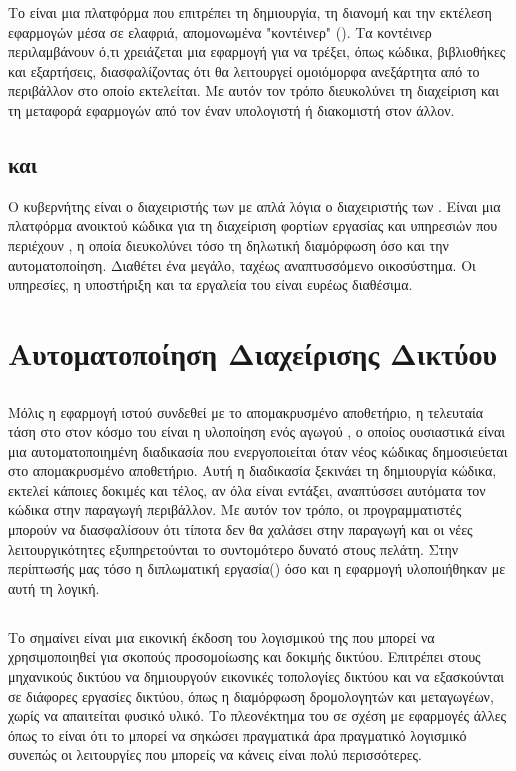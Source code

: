 Το  είναι μια πλατφόρμα που επιτρέπει τη δημιουργία, τη διανομή και την εκτέλεση εφαρμογών μέσα σε ελαφριά, απομονωμένα "κοντέινερ" (). 
Τα κοντέινερ περιλαμβάνουν ό,τι χρειάζεται μια εφαρμογή για να τρέξει, όπως κώδικα, βιβλιοθήκες και εξαρτήσεις, διασφαλίζοντας ότι θα λειτουργεί ομοιόμορφα 
ανεξάρτητα από το περιβάλλον στο οποίο εκτελείται. Με αυτόν τον τρόπο διευκολύνει τη διαχείριση και τη μεταφορά εφαρμογών από τον έναν υπολογιστή ή διακομιστή 
στον άλλον.

\subsection{ και }
Ο κυβερνήτης είναι ο διαχειριστής των με απλά λόγια ο διαχειριστής των . Είναι μια 
πλατφόρμα ανοικτού κώδικα για τη διαχείριση φορτίων εργασίας και υπηρεσιών που περιέχουν 
, η οποία διευκολύνει τόσο τη δηλωτική διαμόρφωση όσο και την αυτοματοποίηση. 
Διαθέτει ένα μεγάλο, ταχέως αναπτυσσόμενο οικοσύστημα. Οι υπηρεσίες, η υποστήριξη και τα εργαλεία του  είναι ευρέως διαθέσιμα.

\section{Αυτοματοποίηση Διαχείρισης Δικτύου}

\subsection{}
Μόλις η εφαρμογή ιστού συνδεθεί με το απομακρυσμένο αποθετήριο, η τελευταία τάση στο
στον κόσμο του  είναι η υλοποίηση ενός αγωγού , ο οποίος ουσιαστικά
είναι μια αυτοματοποιημένη διαδικασία που ενεργοποιείται όταν νέος κώδικας δημοσιεύεται στο
απομακρυσμένο αποθετήριο. Αυτή η διαδικασία ξεκινάει τη δημιουργία κώδικα, εκτελεί κάποιες δοκιμές και
τέλος, αν όλα είναι εντάξει, αναπτύσσει αυτόματα τον κώδικα στην παραγωγή
περιβάλλον. Με αυτόν τον τρόπο, οι προγραμματιστές μπορούν να διασφαλίσουν ότι τίποτα δεν θα χαλάσει
στην παραγωγή και οι νέες λειτουργικότητες εξυπηρετούνται το συντομότερο δυνατό στους
πελάτη. Στην περίπτωσής μας τόσο η διπλωματική εργασία() όσο και η εφαρμογή υλοποιήθηκαν με αυτή τη λογική.


\subsection{}
Το  σημαίνει  είναι μια εικονική έκδοση του λογισμικού  της  που 
μπορεί να χρησιμοποιηθεί για σκοπούς προσομοίωσης και δοκιμής δικτύου. Επιτρέπει στους μηχανικούς δικτύου να δημιουργούν εικονικές τοπολογίες δικτύου και να εξασκούνται σε διάφορες εργασίες δικτύου, 
όπως η διαμόρφωση δρομολογητών και μεταγωγέων, χωρίς να απαιτείται φυσικό υλικό. Το πλεονέκτημα του  σε σχέση με εφαρμογές άλλες όπως το  είναι ότι το  
μπορεί να σηκώσει πραγματικά  άρα πραγματικό λογισμικό συνεπώς οι λειτουργίες που μπορείς να κάνεις είναι πολύ περισσότερες.


